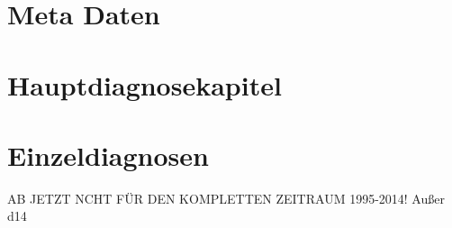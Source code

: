 \documentclass[11pt, a4paper]{scrartcl} %
\begin{document}
%




\section{Meta Daten}





\section{Hauptdiagnosekapitel}














\section{Einzeldiagnosen}







\newpage
AB JETZT NCHT FÜR DEN KOMPLETTEN ZEITRAUM 1995-2014! 
Außer d14
\newpage
\end{document}
